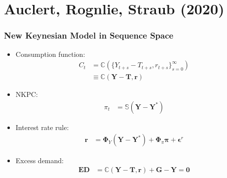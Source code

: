 \documentclass[english,xcolor=svgnames]{beamer}
\begin{document}
\section{Auclert, Rognlie, Straub (2020)}

\begin{frame}
    \frametitle{New Keynesian Model in Sequence Space}
    \begin{itemize}
        \item Consumption function:
        \begin{align*}
            C_t &= \mathbb{C}(\{Y_{t+s}-T_{t+s},r_{t+s}\}_{s=0}^{\infty}) \\
            &\equiv \mathbb{C}(\bm{Y}-\bm{T},\bm{r})
        \end{align*}
        \item NKPC:
        \begin{align*}
            \pi_t &= \mathbb{S}(\bm{Y} - \bm{Y}^*) 
        \end{align*}
        \item Interest rate rule:
        \begin{align*}
            \bm{r} &= \bm{\Phi}_Y (\bm{Y} - \bm{Y}^*) +  \bm{\Phi}_\pi \bm{\pi} + \bm{\epsilon}^r 
        \end{align*}
        \item Excess demand:
        \begin{align*}
            \bm{ED} &= \pmb{\mathbb{C}}(\bm{Y}-\bm{T},\bm{r}) + \bm{G} - \bm{Y} =\bm{0}
        \end{align*}
    \end{itemize}
\end{frame}
\end{document}
